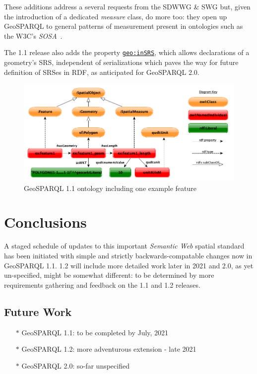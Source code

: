 \documentclass[runningheads]{llncs}
\begin{document}
These additions address a several requests from the SDWWG \& SWG but, given the introduction of a dedicated \textit{measure} class, 
do more too: they open up GeoSPARQL to general patterns of measurement present in ontologies 
such as the W3C's \textit{SOSA}~\cite{haller_semantic_2017}.

The 1.1 release also adds the property \href{http://www.opengis.net/def/function/geosparql/inSRS}{\texttt{geo:inSRS}}, which allows declarations of a geometry's SRS, independent of serializations which paves the way 
for future definition of SRSes in RDF, as anticipated for GeoSPARQL 2.0.

\begin{figure}[htb]
    \centering
    \includegraphics[width=\linewidth]{images/geold_ontology.png}
    \caption{GeoSPARQL 1.1 ontology including one example feature}
    \label{fig:geosparql11ontology}
\end{figure}

\section{Conclusions}\label{sec:conclusions}
A staged schedule of updates to this important \textit{Semantic Web} spatial standard has been initiated with simple and strictly backwards-compatable changes now in GeoSPARQL 1.1. 1.2 will include more detailed work later in 2021 and 2.0, as yet un-specified, might be somewhat different: to be determined by more requirements gathering and feedback on the 1.1 and 1.2 releases.

\subsection{Future Work}\label{sec:futurework}
\begin{itemize}
    \item[$\ast$] GeoSPARQL 1.1: to be completed by July, 2021
    \item[$\ast$] GeoSPARQL 1.2: more adventurous extension - late 2021
    \item[$\ast$] GeoSPARQL 2.0: so-far unspecified
\end{itemize}
\end{document}
